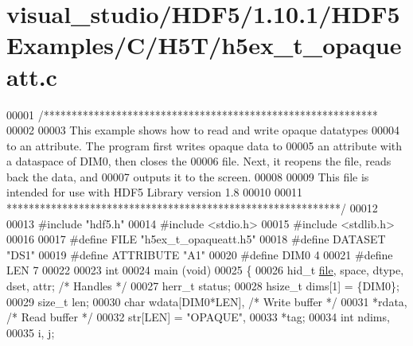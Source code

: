 \hypertarget{visual__studio_2_h_d_f5_21_810_81_2_h_d_f5_examples_2_c_2_h5_t_2h5ex__t__opaqueatt_8c_source}{}\section{visual\+\_\+studio/\+H\+D\+F5/1.10.1/\+H\+D\+F5\+Examples/\+C/\+H5\+T/h5ex\+\_\+t\+\_\+opaqueatt.c}
\label{visual__studio_2_h_d_f5_21_810_81_2_h_d_f5_examples_2_c_2_h5_t_2h5ex__t__opaqueatt_8c_source}

\begin{DoxyCode}
00001 \textcolor{comment}{/************************************************************}
00002 \textcolor{comment}{}
00003 \textcolor{comment}{  This example shows how to read and write opaque datatypes}
00004 \textcolor{comment}{  to an attribute.  The program first writes opaque data to}
00005 \textcolor{comment}{  an attribute with a dataspace of DIM0, then closes the}
00006 \textcolor{comment}{  file. Next, it reopens the file, reads back the data, and}
00007 \textcolor{comment}{  outputs it to the screen.}
00008 \textcolor{comment}{}
00009 \textcolor{comment}{  This file is intended for use with HDF5 Library version 1.8}
00010 \textcolor{comment}{}
00011 \textcolor{comment}{ ************************************************************/}
00012 
00013 \textcolor{preprocessor}{#include "hdf5.h"}
00014 \textcolor{preprocessor}{#include <stdio.h>}
00015 \textcolor{preprocessor}{#include <stdlib.h>}
00016 
00017 \textcolor{preprocessor}{#define FILE            "h5ex\_t\_opaqueatt.h5"}
00018 \textcolor{preprocessor}{#define DATASET         "DS1"}
00019 \textcolor{preprocessor}{#define ATTRIBUTE       "A1"}
00020 \textcolor{preprocessor}{#define DIM0            4}
00021 \textcolor{preprocessor}{#define LEN             7}
00022 
00023 \textcolor{keywordtype}{int}
00024 main (\textcolor{keywordtype}{void})
00025 \{
00026     hid\_t       \hyperlink{structfile}{file}, space, dtype, dset, attr;     \textcolor{comment}{/* Handles */}
00027     herr\_t      status;
00028     hsize\_t     dims[1] = \{DIM0\};
00029     \textcolor{keywordtype}{size\_t}      len;
00030     \textcolor{keywordtype}{char}        wdata[DIM0*LEN],                    \textcolor{comment}{/* Write buffer */}
00031                 *rdata,                             \textcolor{comment}{/* Read buffer */}
00032                 str[LEN] = \textcolor{stringliteral}{"OPAQUE"},
00033                 *tag;
00034     \textcolor{keywordtype}{int}         ndims,
00035                 i, j;

\end{DoxyCode}

